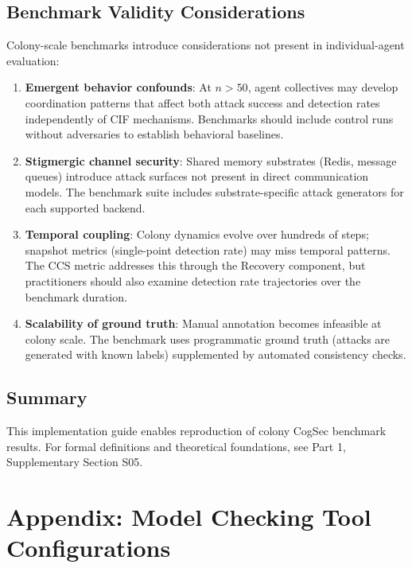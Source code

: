 \documentclass[
]{article}
\begin{document}
\subsection{Benchmark Validity
Considerations}\label{sec:benchmark-validity}

Colony-scale benchmarks introduce considerations not present in
individual-agent evaluation:

\begin{enumerate}
\def\labelenumi{\arabic{enumi}.}
\item
  \textbf{Emergent behavior confounds}: At \(n > 50\), agent collectives
  may develop coordination patterns that affect both attack success and
  detection rates independently of CIF mechanisms. Benchmarks should
  include control runs without adversaries to establish behavioral
  baselines.
\item
  \textbf{Stigmergic channel security}: Shared memory substrates (Redis,
  message queues) introduce attack surfaces not present in direct
  communication models. The benchmark suite includes substrate-specific
  attack generators for each supported backend.
\item
  \textbf{Temporal coupling}: Colony dynamics evolve over hundreds of
  steps; snapshot metrics (single-point detection rate) may miss
  temporal patterns. The CCS metric addresses this through the Recovery
  component, but practitioners should also examine detection rate
  trajectories over the benchmark duration.
\item
  \textbf{Scalability of ground truth}: Manual annotation becomes
  infeasible at colony scale. The benchmark uses programmatic ground
  truth (attacks are generated with known labels) supplemented by
  automated consistency checks.
\end{enumerate}

\subsection{Summary}\label{summary-1}

This implementation guide enables reproduction of colony CogSec
benchmark results. For formal definitions and theoretical foundations,
see Part 1, Supplementary Section S05.

\newpage

\section{Appendix: Model Checking Tool
Configurations}\label{sec:model-checking-tools}
\end{document}
